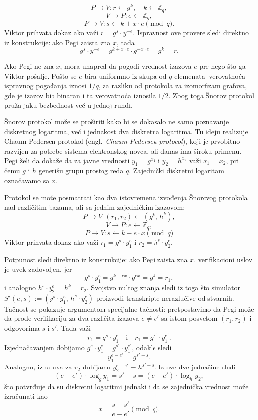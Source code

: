 \[
  P \to V : r \leftarrow g^k, \quad k \leftarrow \mathbb{Z}_q,
\]
\[
  V \to P : e \leftarrow \mathbb{Z}_q,
\]
\[
  P \to V : s \leftarrow k + x \cdot e \pmod{q}.
\]
Viktor prihvata dokaz ako važi $r = g^s \cdot y^{-e}$. Ispravnost ove 
provere sledi direktno iz konstrukcije: ako Pegi zaista zna $x$, tada
\[
  g^s \cdot y^{-e} = g^{k + x \cdot e} \cdot g^{-x \cdot e} = g^k = r.
\]

Ako Pegi ne zna $x$, mora unapred da pogodi vrednost izazova $e$ pre 
nego što ga Viktor pošalje. Pošto se $e$ bira uniformno iz skupa od 
$q$ elemenata, verovatnoća ispravnog pogađanja iznosi $1/q$, za 
razliku od protokola za izomorfizam grafova, gde je izazov bio binaran 
i ta verovatnoća iznosila $1/2$. Zbog toga Šnorov protokol pruža 
jaku bezbednost već u jednoj rundi.

Šnorov protokol može se proširiti kako bi se dokazalo ne samo 
poznavanje diskretnog logaritma, već i jednakost dva diskretna 
logaritma. Tu ideju realizuje Chaum-Pedersen protokol (engl.\ \textit{Chaum-Pedersen protocol}), 
koji je prvobitno razvijen za potrebe sistema elektronskog novca, ali 
danas ima široku primenu. Pegi želi da dokaže da za javne vrednosti 
$y_1 = g^{x_1}$ i $y_2 = h^{x_2}$ važi $x_1 = x_2$, pri čemu $g$ 
i $h$ generišu grupu prostog reda $q$. Zajednički diskretni logaritam 
označavamo sa $x$.

Protokol se može posmatrati kao dva istovremena izvođenja Šnorovog 
protokola nad različitim bazama, ali sa jednim zajedničkim izazovom:
\[
  P \to V : (r_1, r_2) \leftarrow (g^k,\, h^k),
\]
\[
  V \to P : e \leftarrow \mathbb{Z}_q,
\]
\[
  P \to V : s \leftarrow k - e \cdot x \pmod{q}
\]
Viktor prihvata dokaz ako važi $r_1 = g^s \cdot y_1^e$ i 
$r_2 = h^s \cdot y_2^e$.

Potpunost sledi direktno iz konstrukcije: ako Pegi zaista zna $x$, 
verifikacioni uslov je uvek zadovoljen, jer
\[
  g^s \cdot y_1^e = g^{k-ex} \cdot g^{ex} = g^k = r_1,
\]
i analogno $h^s \cdot y_2^e = h^k = r_2$.
Svojstvo nultog znanja sledi iz toga što simulator 
$S'(e,s) := (g^s \cdot y_1^e,\, h^s \cdot y_2^e)$ 
proizvodi transkripte nerazlučive od stvarnih. 
Tačnost se pokazuje argumentom specijalne tačnosti: pretpostavimo da 
Pegi može da prođe verifikaciju za dva različita izazova $e \neq e'$ 
sa istom posvetom $(r_1, r_2)$ i odgovorima $s$ i $s'$. Tada važi
\[
  r_1 = g^s \cdot y_1^e \quad \text{i} \quad r_1 = g^{s'} \cdot y_1^{e'}.
\]
Izjednačavanjem dobijamo $g^s \cdot y_1^e = g^{s'} \cdot y_1^{e'}$, 
odakle sledi
\[
  y_1^{e-e'} = g^{s'-s}.
\]
Analogno, iz uslova za $r_2$ dobijamo $y_2^{e-e'} = h^{s'-s}$. 
Iz ove dve jednačine sledi
\[
  (e-e') \cdot \log_g y_1 = s'-s = (e-e') \cdot \log_h y_2,
\]
što potvrđuje da su diskretni logaritmi jednaki i da se zajednička 
vrednost može izračunati kao
\[
  x = \frac{s - s'}{e - e'} \pmod{q}.
\]

